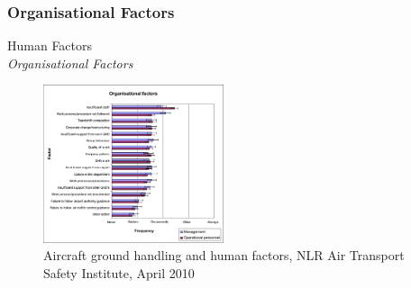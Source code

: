 \subsubsection{Organisational Factors}
\begin{frame}{Human Factors\\\small\textit{Organisational Factors}}{}
	\begin{figure}[H]
	\centering
	\includegraphics[width=200px]{Grafik/OrganisationalFactors}
	\caption{\footnotesize Aircraft ground handling and human factors, NLR Air Transport Safety Institute, April 2010}
\end{figure}
\end{frame}